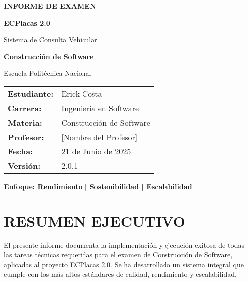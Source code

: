 \documentclass[12pt,a4paper]{article}
\begin{document}
\begin{titlepage}
    \centering
    \vspace*{2cm}
    
    {\Huge\textbf{\textcolor{epnblue}{INFORME DE EXAMEN}}\par}
    \vspace{0.5cm}
    {\Large\textbf{\textcolor{epnblue}{ECPlacas 2.0}}\par}
    \vspace{0.3cm}
    {\large Sistema de Consulta Vehicular\par}
    \vspace{2cm}
    
    {\Large\textbf{Construcción de Software}\par}
    \vspace{0.5cm}
    {\large Escuela Politécnica Nacional\par}
    \vspace{3cm}
    
    \begin{tabular}{l l}
        \textbf{Estudiante:} & Erick Costa \\
        \textbf{Carrera:} & Ingeniería en Software \\
        \textbf{Materia:} & Construcción de Software \\
        \textbf{Profesor:} & [Nombre del Profesor] \\
        \textbf{Fecha:} & 21 de Junio de 2025 \\
        \textbf{Versión:} & 2.0.1 \\
    \end{tabular}
    
    \vfill
    
    {\large\textbf{\textcolor{epnblue}{Enfoque: Rendimiento | Sostenibilidad | Escalabilidad}}\par}
    
\end{titlepage}

\tableofcontents
\newpage

\section{RESUMEN EJECUTIVO}

El presente informe documenta la implementación y ejecución exitosa de todas las tareas técnicas requeridas para el examen de Construcción de Software, aplicadas al proyecto ECPlacas 2.0. Se ha desarrollado un sistema integral que cumple con los más altos estándares de calidad, rendimiento y escalabilidad.
\end{document}
